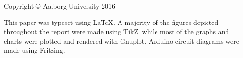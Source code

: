 \thispagestyle{empty}
{\small
\strut\vfill
\noindent Copyright \copyright{} Aalborg University 2016\par
\vspace{0.2cm}
\noindent This paper was typeset using \LaTeX. A majority of the figures depicted throughout the report were made using TikZ, while most of the graphs and charts were plotted and rendered with Gnuplot. Arduino circuit diagrams were made using Fritzing.}
\clearpage
